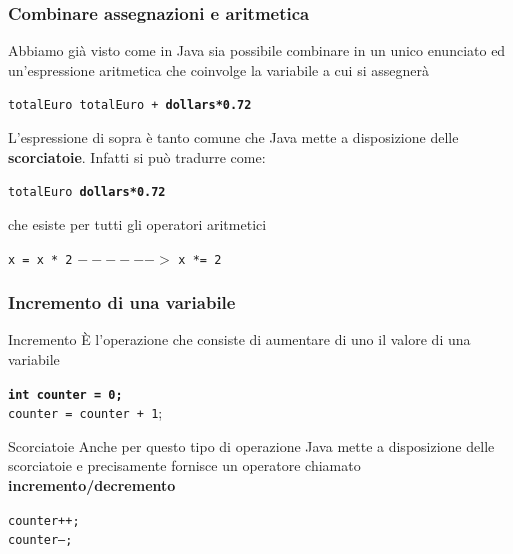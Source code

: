 \begin{frame}
\frametitle{Combinare assegnazioni e aritmetica}
Abbiamo già visto come in Java sia possibile combinare in un unico enunciato  ed \alert{un'espressione
aritmetica che coinvolge la variabile a cui si assegnerà}
\begin{center}
\texttt{\alert{totalEuro} \textCl{=} \alert{totalEuro} + \textbf{dollars*0.72}}
\end{center}
\begin{block}{}
L'espressione di sopra è tanto comune che Java mette a disposizione delle \textbf{scorciatoie}. Infatti si può tradurre come:
\begin{center}
\texttt{\alert{totalEuro} \textCl{+=} \textbf{dollars*0.72}}
\end{center}
che esiste per tutti gli operatori aritmetici
\begin{center}
\texttt{x = x \alert{*} 2} $------>$ \texttt{x \alert{*=} 2}
\end{center}
\end{block}
\end{frame}

\begin{frame}
\frametitle{Incremento di una variabile}
\begin{block}{Incremento}
\`E l'operazione che consiste di aumentare di uno il valore di una variabile
\begin{center}
\texttt{\textbf{int counter = 0;}}\\
\texttt{\alert{counter = counter + 1}};
\end{center}
\end{block}
\begin{block}{Scorciatoie}
Anche per questo tipo di operazione Java mette a disposizione delle scorciatoie e precisamente fornisce un operatore chiamato
\textbf{incremento/decremento}
\begin{center}
\texttt{\alert{counter++;}}\\
\texttt{\alert{counter--;}}
\end{center}
\end{block}
\end{frame}  
